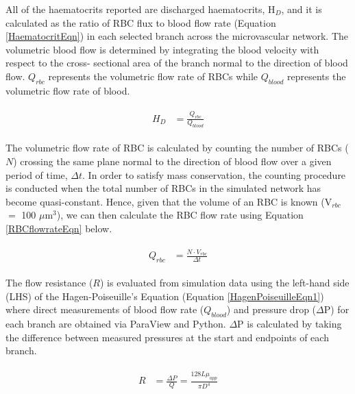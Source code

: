 \noindent All of the haematocrits reported are discharged haematocrits, H$_{D}$, and it is calculated as the ratio of RBC flux to blood flow rate (Equation \ref{HaematocritEqn}) in each selected branch across the microvascular network. The volumetric blood flow is determined by integrating the blood velocity with respect to the cross- sectional area of the branch normal to the direction of blood flow. $Q_{rbc}$ represents the volumetric flow rate of RBCs while $Q_{blood}$ represents the volumetric flow rate of blood.

\begin{eqnarray}
\label{HaematocritEqn}
\begin{aligned}
H_{D} & = \frac{Q_{rbc}}{Q_{blood}}
\end{aligned}
\end{eqnarray}

\bigskip

\noindent The volumetric flow rate of RBC is calculated by counting the number of RBCs ($N$) crossing the same plane normal to the direction of blood flow over a given period of time, $\Delta t$. In order to satisfy mass conservation, the counting procedure is conducted when the total number of RBCs in the simulated network has become quasi-constant. Hence, given that the volume of an RBC is known (V$_{rbc}$ $=$ 100 $\mu$m$^{3}$), we can then calculate the RBC flow rate using Equation \ref{RBCflowrateEqn} below. 

\begin{eqnarray}
\label{RBCflowrateEqn}
\begin{aligned}
Q_{rbc} & = \frac{N \cdot V_{rbc}}{\Delta t}
\end{aligned}
\end{eqnarray}

\bigskip

\noindent The flow resistance ($R$) is evaluated from simulation data using the left-hand side (LHS) of the Hagen-Poiseuille's Equation\cite{PoiseuilleLaw} (Equation \ref{HagenPoiseuilleEqn1}) where direct measurements of blood flow rate ($Q_{blood}$) and pressure drop ($\Delta$P) for each branch are obtained via ParaView and Python. $\Delta$P is calculated by taking the difference between measured pressures at the start and endpoints of each branch. 

\begin{eqnarray}
\label{HagenPoiseuilleEqn1}
\begin{aligned}
R & = \frac{\Delta P}{Q} = \frac{128L\mu_{app}}{\pi D^{4}}
\end{aligned}
\end{eqnarray}

